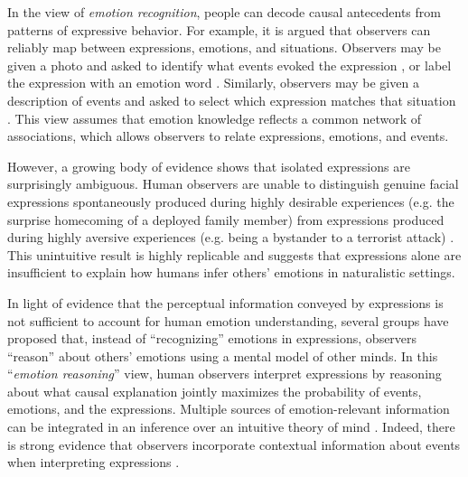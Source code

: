 \documentclass[10pt,letterpaper]{article}
\begin{document}
In the view of {\em emotion recognition}, people can decode causal antecedents from patterns of expressive behavior. For example, it is argued that observers can reliably map between expressions, emotions, and situations. Observers may be given a photo and asked to identify what events evoked the expression \citep{haidt1999ce}, or label the expression with an emotion word \citep{tracy2004ps}. Similarly, observers may be given a description of events and asked to select which expression matches that situation \citep{cordaro2020facebody}. 
This view assumes that emotion knowledge reflects a common network of associations, which allows observers to relate expressions, emotions, and events. 

However, a growing body of evidence shows that isolated expressions are surprisingly ambiguous. Human observers are unable to distinguish genuine facial expressions spontaneously produced during highly desirable experiences (e.g. the surprise homecoming of a deployed family member) from expressions produced during highly aversive experiences (e.g. being a bystander to a terrorist attack) \citep{wenzler2016pleasurepain, israelashvili2019dynamicambig}.
This unintuitive result is highly replicable \citep{camerer2018manylabsnatsci} and suggests that expressions alone are insufficient to explain how humans infer others' emotions in naturalistic settings. 

In light of evidence that the perceptual information conveyed by expressions is not sufficient to account for human emotion understanding, several groups have proposed that, instead of ``recognizing'' emotions in expressions, observers ``reason'' about others' emotions using a mental model of other minds. 
In this ``{\em emotion reasoning}'' view, human observers interpret expressions by reasoning about what causal explanation jointly maximizes the probability of events, emotions, and the expressions.
Multiple sources of emotion-relevant information can be integrated in an inference over an intuitive theory of mind \citep{saxe2017cop, ong2015cueint, ong2019topics, hoegen2019emoreg, wu2018childinvplan, freemanambady2011dynamicinteractive}. 
Indeed, there is strong evidence that observers incorporate contextual information about events when interpreting expressions \citep{aviezer2012science, kayyal2015context, anzellotti2021emotion}. 
\end{document}
